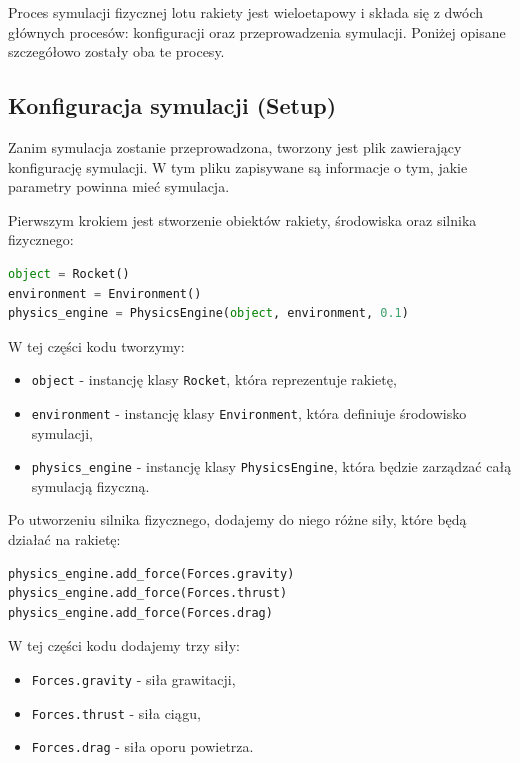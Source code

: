 Proces symulacji fizycznej lotu rakiety jest wieloetapowy i składa się z
dwóch głównych procesów: konfiguracji oraz przeprowadzenia symulacji.
Poniżej opisane szczegółowo zostały oba te procesy.

\subsection{Konfiguracja symulacji (Setup)}

Zanim symulacja zostanie przeprowadzona, tworzony jest plik zawierający
konfigurację symulacji. W tym pliku zapisywane są informacje o tym, jakie
parametry powinna mieć symulacja.

Pierwszym krokiem jest stworzenie obiektów rakiety, środowiska oraz silnika
fizycznego:

\begin{lstlisting}[language=Python]
object = Rocket()
environment = Environment()
physics_engine = PhysicsEngine(object, environment, 0.1)
\end{lstlisting}

\noindent
W tej części kodu tworzymy:
\begin{itemize}
    \item \texttt{object} - instancję klasy \texttt{Rocket}, która reprezentuje rakietę,
    \item \texttt{environment} - instancję klasy \texttt{Environment}, która definiuje środowisko symulacji,
    \item \texttt{physics\_engine} - instancję klasy \texttt{PhysicsEngine}, która będzie zarządzać całą symulacją fizyczną.
\end{itemize}

Po utworzeniu silnika fizycznego, dodajemy do niego różne siły, które będą działać na rakietę:

\begin{lstlisting}[language=Python]
physics_engine.add_force(Forces.gravity)
physics_engine.add_force(Forces.thrust)
physics_engine.add_force(Forces.drag)
\end{lstlisting}

\noindent
W tej części kodu dodajemy trzy siły:
\begin{itemize}
    \item \texttt{Forces.gravity} - siła grawitacji,
    \item \texttt{Forces.thrust} - siła ciągu,
    \item \texttt{Forces.drag} - siła oporu powietrza.
\end{itemize}

